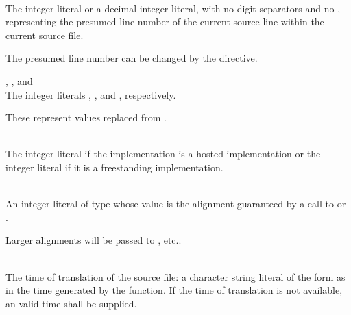 \begin{description}
\item
{}%
\\
The integer literal  or a decimal integer literal,
with no digit separators and no ,
representing the presumed line number of
the current source line within the current source file.
\begin{note}
The presumed line number can be changed by the  directive.
\end{note}

\item
{}%
%
%
, , and \\
The integer literals , , and , respectively.
\begin{note}
These represent values replaced from .
\end{note}

\item
{}%
%
%
\\
The integer literal 
if the implementation is a hosted implementation or
the integer literal 
if it is a freestanding implementation.

\item
{}%
\\
An integer literal of type 
whose value is the alignment guaranteed
by a call to 
or .
\begin{note}
Larger alignments will be passed to
, etc..
\end{note}

\item
{}%
\\
The time of translation of the source file:
a character string literal of the form
as in the time generated by the
function.
If the time of translation is not available,
an  valid time shall be supplied.
\end{description}

